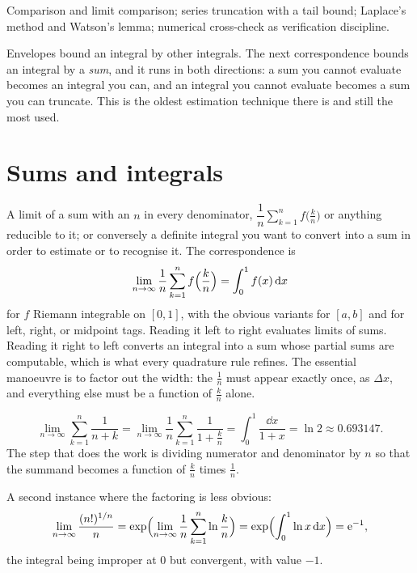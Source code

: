 \begin{seealsob}Comparison and limit comparison; series truncation with a tail bound; Laplace's method and Watson's lemma; numerical cross-check as verification discipline.\end{seealsob}

Envelopes bound an integral by other integrals. The next correspondence bounds an integral by a \emph{sum}, and it runs in both directions: a sum you cannot evaluate becomes an integral you can, and an integral you cannot evaluate becomes a sum you can truncate. This is the oldest estimation technique there is and still the most used.

\section{Sums and integrals}

\cue A limit of a sum with an $n$ in every denominator, $\dfrac1n\sum_{k=1}^{n}f\bigl(\tfrac kn\bigr)$ or anything reducible to it; or conversely a definite integral you want to convert into a sum in order to estimate or to recognise it.
\method The correspondence is
\[\lim_{n\to\infty}\frac1n\sum_{k=1}^{n}f\Bigl(\frac kn\Bigr)=\int_0^{1}f(x)\,\mathrm{d} x\]
for $f$ Riemann integrable on $[0,1]$, with the obvious variants for $[a,b]$ and for left, right, or midpoint tags. Reading it left to right evaluates limits of sums. Reading it right to left converts an integral into a sum whose partial sums are computable, which is what every quadrature rule refines. The essential manoeuvre is to factor out the width: the $\tfrac1n$ must appear exactly once, as $\Delta x$, and everything else must be a function of $\tfrac kn$ alone.

\begin{worked}
\[\lim_{n\to\infty}\sum_{k=1}^{n}\frac{1}{n+k}=\lim_{n\to\infty}\frac1n\sum_{k=1}^{n}\frac{1}{1+\tfrac kn}=\int_0^{1}\frac{\dd x}{1+x}=\ln2\approx0.693147.\]
The step that does the work is dividing numerator and denominator by $n$ so that the summand becomes a function of $\tfrac kn$ times $\tfrac1n$.

A second instance where the factoring is less obvious:
\[\lim_{n\to\infty}\frac{(n!)^{1/n}}{n}=\exp\Bigl(\lim_{n\to\infty}\frac1n\sum_{k=1}^{n}\ln\frac kn\Bigr)=\exp\Bigl(\int_0^{1}\ln x\,\mathrm{d} x\Bigr)=\mathrm{e}^{-1},\]
the integral being improper at $0$ but convergent, with value $-1$.
\end{worked}

